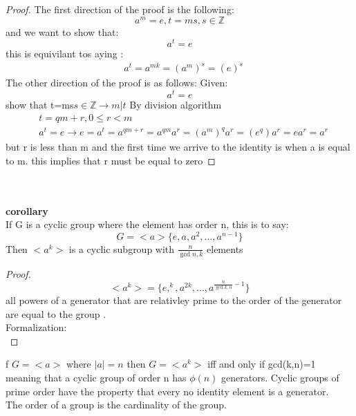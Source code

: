 \documentclass[11pt]{article}
\theoremstyle{definition}  %
\newcommand{\Z}{\mathbb{Z}}
\newcommand{\bigline}{\\\noindent\makebox[\linewidth]{\rule{\paperwidth}{0.4pt}}\\}
\begin{document}
\begin{proof}
  The first direction of the proof is the following:
  \[
    a^m=e, t=ms,s\in \Z
  \]
  and we want to show that:
  \[
    a^t=e
  \]
  this is equivilant tos aying :
  \begin{align*}
    &a^t=a^{mk}=(a^m)^s=(e)^s
  \end{align*}
  The other direction of the proof is as follows:
  Given:
  \[
    a^t=e
  \]
  show that t=ms$s\in \Z\rightarrow m|t$ By division algorithm
  \begin{align*}
    &t=qm+r, 0\leq r < m\\
    &a^t=e \rightarrow e=a^t=a^{qm+r}=a^{qm}a^r=(a^m)^qa^r=(e^q)a^r=ea^r=a^r
  \end{align*}
  but r is less than m and the first time we arrive to the identity is when a is equal to m. this implies that r must be equal to zero
\end{proof}
\bigline
\textbf{corollary}\\
If G is a cyclic group where the element has order n, this is to say:
\[
  G=<a>\{e,a,a^2,...,a^{n-1}\}
\]
Then $  <a^k> $ is a cyclic subgroup with $\frac{n}{\gcd{n,k}}$ elements\\
\begin{proof}
  \[
    <a^k>=\{e,^k,a^{2k},...,a^{\frac{n}{\gcd{k,n}}-1}\}
  \]
  all powers of a generator that are relativley prime to the order of the generator are equal to the group .\\
  Formalization:\\

\end{proof}
f $G=<a>$ where $|a|=n$ then $G=<a^k>$ iff and only if gcd(k,n)=1 meaning that a cyclic group of order n has $\phi (n)$ generators. Cyclic groups of prime order have the property that every no identity element is a generator. \\
The order of a group is the cardinality of the group.
\end{document}
